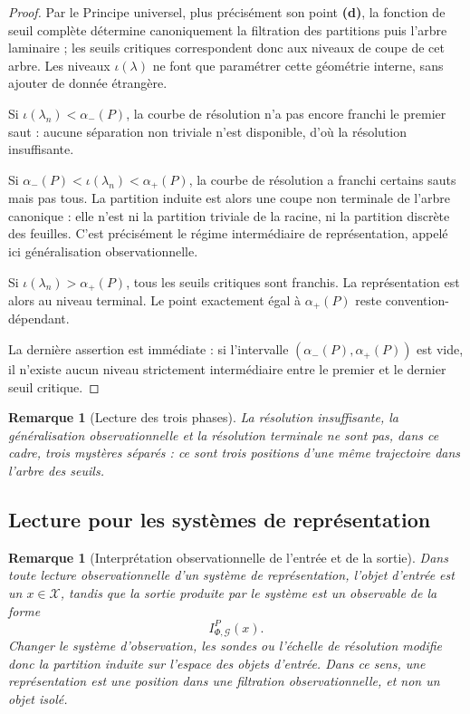 \documentclass[11pt,a4paper,openany]{book}
\newtheorem{remark}[definition]{Remarque}
\begin{document}
\begin{proof}
Par le Principe universel, plus précisément son point \textbf{(d)}, la fonction de seuil complète détermine canoniquement la filtration des partitions puis l'arbre laminaire ; les seuils critiques correspondent donc aux niveaux de coupe de cet arbre. Les niveaux \(\iota(\lambda)\) ne font que paramétrer cette géométrie interne, sans ajouter de donnée étrangère.

Si \(\iota(\lambda_n)< \alpha_-(P)\), la courbe de résolution n'a pas encore franchi le premier saut : aucune séparation non triviale n'est disponible, d'où la résolution insuffisante.

Si \(\alpha_-(P)< \iota(\lambda_n)< \alpha_+(P)\), la courbe de résolution a franchi certains sauts mais pas tous. La partition induite est alors une coupe non terminale de l'arbre canonique : elle n'est ni la partition triviale de la racine, ni la partition discrète des feuilles. C'est précisément le régime intermédiaire de représentation, appelé ici généralisation observationnelle.

Si \(\iota(\lambda_n)> \alpha_+(P)\), tous les seuils critiques sont franchis. La représentation est alors au niveau terminal. Le point exactement égal à \(\alpha_+(P)\) reste convention-dépendant.

La dernière assertion est immédiate : si l'intervalle \((\alpha_-(P),\alpha_+(P))\) est vide, il n'existe aucun niveau strictement intermédiaire entre le premier et le dernier seuil critique.
\end{proof}

\begin{remark}[Lecture des trois phases]
La résolution insuffisante, la généralisation observationnelle et la résolution terminale ne sont pas, dans ce cadre, trois mystères séparés : ce sont trois positions d'une même trajectoire dans l'arbre des seuils.
\end{remark}

\subsection{Lecture pour les systèmes de représentation}

\begin{remark}[Interprétation observationnelle de l'entrée et de la sortie]
Dans toute lecture observationnelle d'un système de représentation, l'objet d'entrée est un \(x\in\mathcal X\), tandis que la sortie produite par le système est un observable de la forme
\[
I_{\Phi,\mathcal G}^P(x).
\]
Changer le système d'observation, les sondes ou l'échelle de résolution modifie donc la partition induite sur l'espace des objets d'entrée. Dans ce sens, une représentation est une position dans une filtration observationnelle, et non un objet isolé.
\end{remark}
\end{document}
